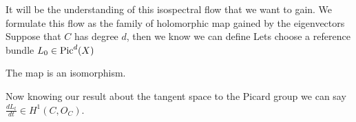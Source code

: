 \documentclass{article}
\begin{document}
It will be the understanding of this isospectral flow that we want to gain. We formulate this flow as the family of holomorphic map gained by the eigenvectors 
Suppose that $C$ has degree $d$, then we know we can define 
Lets choose a reference bundle $L_0 \in \operatorname{Pic}^d(X)$ 
\begin{lemma}
	The map 
is an isomorphism. 
\end{lemma}
Now knowing our result about the tangent space to the Picard group we can say $\frac{dL_t}{dt} \in H^1(C,O_C)$. 


\end{document}
